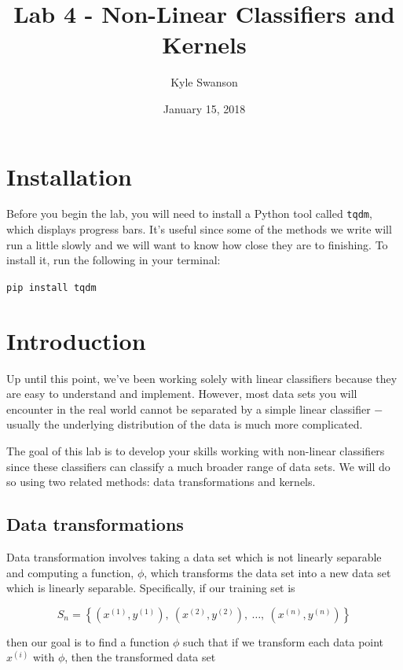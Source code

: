 \documentclass{article}
\title{Lab 4 - Non-Linear Classifiers and Kernels}
\author{Kyle Swanson}
\date{January 15, 2018}
\begin{document}
\maketitle

\section{Installation}

Before you begin the lab, you will need to install a Python tool called \texttt{tqdm}, which displays progress bars. It's useful since some of the methods we write will run a little slowly and we will want to know how close they are to finishing. To install it, run the following in your terminal:

\vspace{2mm}

\begin{center}
    \texttt{pip install tqdm}
\end{center}

\section{Introduction}

Up until this point, we've been working solely with linear classifiers because they are easy to understand and implement. However, most data sets you will encounter in the real world cannot be separated by a simple linear classifier $-$ usually the underlying distribution of the data is much more complicated.

The goal of this lab is to develop your skills working with non-linear classifiers since these classifiers can classify a much broader range of data sets. We will do so using two related methods: data transformations and kernels.

\subsection{Data transformations}

Data transformation involves taking a data set which is not linearly separable and computing a function, $\phi$, which transforms the data set into a new data set which is linearly separable. Specifically, if our training set is

$$S_n = \left\{\left(x^{(1)}, y^{(1)}\right),\ \left(x^{(2)}, y^{(2)}\right),\ \dots,\ \left(x^{(n)}, y^{(n)}\right)\right\}$$

\noindent
then our goal is to find a function $\phi$ such that if we transform each data point $x^{(i)}$ with $\phi$, then the transformed data set
\end{document}
